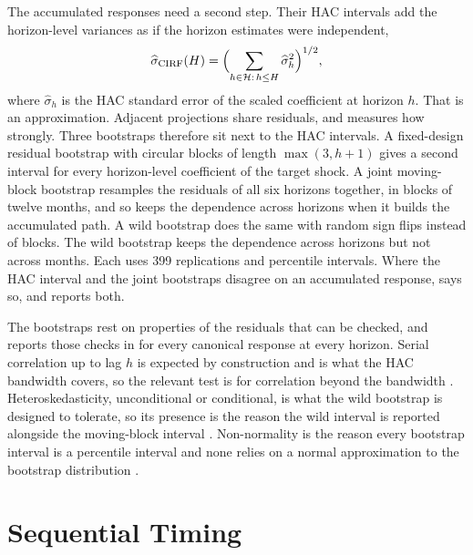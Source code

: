 The accumulated responses need a second step. Their HAC intervals add the horizon-level variances as if the horizon estimates were independent,
\begin{equation}
  \widehat{\sigma}_{\mathrm{CIRF}}(H)
  =
  \Bigl(\sum_{h \in \mathcal{H}:\, h \leq H} \widehat{\sigma}_{h}^{2}\Bigr)^{1/2},
  \label{eq:cumulative-se}
\end{equation}
where \(\widehat{\sigma}_{h}\) is the HAC standard error of the scaled coefficient at horizon \(h\). That is an approximation. Adjacent projections share residuals, and  measures how strongly. Three bootstraps therefore sit next to the HAC intervals. A fixed-design residual bootstrap with circular blocks of length \(\max(3, h+1)\) gives a second interval for every horizon-level coefficient of the target shock. A joint moving-block bootstrap resamples the residuals of all six horizons together, in blocks of twelve months, and so keeps the dependence across horizons when it builds the accumulated path. A wild bootstrap does the same with random sign flips instead of blocks. The wild bootstrap keeps the dependence across horizons but not across months. Each uses 399 replications and percentile intervals. Where the HAC interval and the joint bootstraps disagree on an accumulated response,  says so, and  reports both.

The bootstraps rest on properties of the residuals that can be checked, and  reports those checks in  for every canonical response at every horizon. Serial correlation up to lag \(h\) is expected by construction and is what the HAC bandwidth covers, so the relevant test is for correlation beyond the bandwidth \parencite{LjungBox1978}. Heteroskedasticity, unconditional or conditional, is what the wild bootstrap is designed to tolerate, so its presence is the reason the wild interval is reported alongside the moving-block interval \parencite{BreuschPagan1979,Koenker1981,Engle1982}. Non-normality is the reason every bootstrap interval is a percentile interval and none relies on a normal approximation to the bootstrap distribution \parencite{JarqueBera1980}.

\section{Sequential Timing}
\label{sec:sequential-timing}

